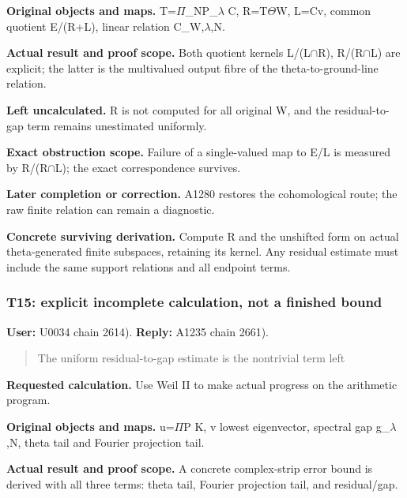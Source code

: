\documentclass[10pt,a4paper,oneside]{report}
\begin{document}
\textbf{Original objects and maps.}
T=\allowbreak{}\ensuremath{Π}\allowbreak{}\_NP\_\allowbreak{}\ensuremath{λ}\allowbreak{}
C, R=T\allowbreak{}\ensuremath{Θ}\allowbreak{}W, L=Cv, common quotient
E/(R+L), linear relation
C\_W,\allowbreak{}\ensuremath{λ}\allowbreak{},N.

\textbf{Actual result and proof scope.} Both quotient kernels
L/(L\allowbreak{}\ensuremath{∩}\allowbreak{}R),
R/(R\allowbreak{}\ensuremath{∩}\allowbreak{}L) are explicit; the latter
is the multivalued output fibre of the theta-to-ground-line relation.

\textbf{Left uncalculated.} R is not computed for all original W, and
the residual-to-gap term remains unestimated uniformly.

\textbf{Exact obstruction scope.} Failure of a single-valued map to E/L
is measured by R/(R\allowbreak{}\ensuremath{∩}\allowbreak{}L); the exact
correspondence survives.

\textbf{Later completion or correction.} A1280 restores the
cohomological route; the raw finite relation can remain a diagnostic.

\textbf{Concrete surviving derivation.} Compute R and the unshifted form
on actual theta-generated finite subspaces, retaining its kernel. Any
residual estimate must include the same support relations and all
endpoint terms.

\subsubsection{T15: explicit incomplete calculation, not a finished
bound}\label{t15-explicit-incomplete-calculation-not-a-finished-bound}

\textbf{User:} U0034
\protect{} chain 2614).
\textbf{Reply:} A1235
\protect{} chain 2661).

\begin{quote}
The uniform residual-to-gap estimate is the nontrivial term left
\end{quote}

\textbf{Requested calculation.} Use Weil II to make actual progress on
the arithmetic program.

\textbf{Original objects and maps.}
u=\allowbreak{}\ensuremath{Π}\allowbreak{}P K, v lowest eigenvector,
spectral gap g\_\allowbreak{}\ensuremath{λ}\allowbreak{},N, theta tail
and Fourier projection tail.

\textbf{Actual result and proof scope.} A concrete complex-strip error
bound is derived with all three terms: theta tail, Fourier projection
tail, and residual/gap.
\end{document}
